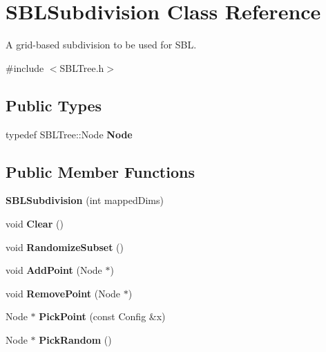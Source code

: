 \section{S\+B\+L\+Subdivision Class Reference}
\label{classSBLSubdivision}


A grid-\/based subdivision to be used for S\+BL.  




{\ttfamily \#include $<$S\+B\+L\+Tree.\+h$>$}

\subsection*{Public Types}
\begin{DoxyCompactItemize}
\item 
typedef S\+B\+L\+Tree\+::\+Node {\bfseries Node}\label{classSBLSubdivision_a7324b5c74750880cec033afb37038a2c}

\end{DoxyCompactItemize}
\subsection*{Public Member Functions}
\begin{DoxyCompactItemize}
\item 
{\bfseries S\+B\+L\+Subdivision} (int mapped\+Dims)\label{classSBLSubdivision_afa9f36ebe972bfaaaca77d1227c01c60}

\item 
void {\bfseries Clear} ()\label{classSBLSubdivision_a72951c73404d234b283b3dc9e3edb3fa}

\item 
void {\bfseries Randomize\+Subset} ()\label{classSBLSubdivision_aff7fca9f5d9636197218d868c3437b83}

\item 
void {\bfseries Add\+Point} (Node $\ast$)\label{classSBLSubdivision_af03a3de4a38b9f8265b0ecce9a3baffa}

\item 
void {\bfseries Remove\+Point} (Node $\ast$)\label{classSBLSubdivision_a04517be59b8fae13417516e44c247db8}

\item 
Node $\ast$ {\bfseries Pick\+Point} (const Config \&x)\label{classSBLSubdivision_a2803f47f6dd4191dba26b7852e4d9ba3}

\item 
Node $\ast$ {\bfseries Pick\+Random} ()\label{classSBLSubdivision_a503125a633d392f8785983750e229a80}

\end{DoxyCompactItemize}
